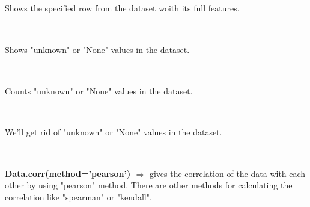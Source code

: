 \documentclass[a4paper,18pt]{article}
\begin{document}

\subsection{\colorbox {matgreen}{\color{white}{\large Data.loc[index]}}}
Shows the specified row from the dataset woith its full features.\\\\


\subsection{\colorbox {matgreen}{\color{white}{\large Data.isna()}}}
Shows "unknown" or "None" values in the dataset.\\\\


\subsection{\colorbox {matgreen}{\color{white}{\large Data.isna().sum()}}}
Counts "unknown" or "None" values in the dataset.\\\\


\subsection{\colorbox {matgreen}{\color{white}{\large Data.dropna()}}}
We'll get rid of "unknown" or "None" values in the dataset.\\\\


\subsection{\colorbox {matgreen}{\color{white}{\large Data.corr(method='pearson')}}}
\textbf{ Data.corr(method='pearson') $\Rightarrow$} gives the correlation of the data with each other by using "pearson" method. There are other methods for calculating the correlation like "spearman" or "kendall". \\\\
\end{document}
